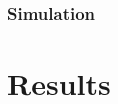 \documentclass[%
nonumbib,      %
%
]{nrc1}                          %
\begin{document}
\subsubsection*{Simulation}





\section*{Results}


\end{document}

